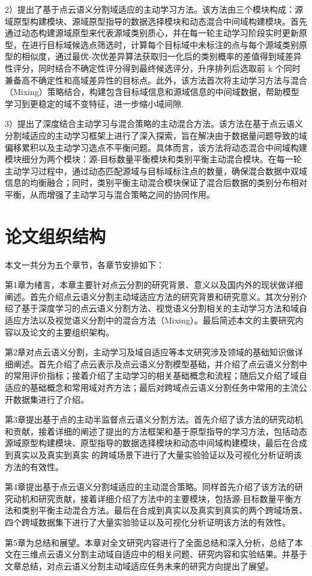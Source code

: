 2）提出了基于点云语义分割域适应的主动学习方法。该方法由三个模块构成：源域原型构建模块、源域原型指导的数据选择模块和动态混合中间域构建模块。首先通过动态构建源域原型来代表源域类别质心，并在每一轮主动学习阶段实时更新原型，在进行目标域候选点筛选时，计算每个目标域中未标注的点与每个源域类别原型的相似度，通过最优-次优差异算法获取归一化后的类别概率的差值得到域差异性评分，同时结合不确定性评分得到最终候选评分，升序排列后选取前 k 个同时兼备高不确定性和高域差异性的目标点。此外，该方法首次将主动学习方法与混合（Mixing）策略结合，构建包含目标域信息和源域信息的中间域数据，帮助模型学习到更稳定的域不变特征，进一步缩小域间隙.

3）提出了深度结合主动学习与混合策略的主动混合方法。该方法在基于点云语义分割域适应的主动学习框架上进行了深入探索，旨在解决由于数据量问题导致的域偏移累积以及主动学习选点不平衡问题。具体而言，该方法将动态混合中间域构建模块细分为两个模块：源-目标数量平衡模块和类别平衡主动混合模块。在每一轮主动学习过程中，通过动态匹配源域与目标域标注点的数量，确保混合数据中双域信息的均衡融合；同时，类别平衡主动混合模块保证了混合后数据的类别分布相对平衡，从而增强了主动学习与混合策略之间的协同作用。
\section{论文组织结构}
本文一共分为五个章节，各章节安排如下：

第1章为绪言，本章主要针对点云分割的研究背景、意义以及国内外的现状做详细阐述。首先介绍点云语义分割主动域适应方法的研究背景和研究意义。其次分别介绍了基于深度学习的点云语义分割方法、视觉语义分割相关的主动学习方法和域自适应方法以及视觉语义分割中的混合方法（Mixing）。最后简述本文的主要研究内容以及论文的主要组织架构。

第2章对点云语义分割，主动学习及域自适应等本文研究涉及领域的基础知识做详细阐述。首先介绍了点云表示及点云语义分割模型基础，并介绍了点云语义分割中的常用评价指标；接着介绍了主动学习的相关基础概念和流程；随后又介绍了域自适应的基础概念和常用域对齐方法；最后对跨域点云语义分割任务中常用的主流公开数据集进行了介绍。

第3章提出基于点的主动半监督点云语义分割方法。首先介绍了该方法的研究动机和贡献，接着详细的阐述了提出的方法框架和基于原型指导的学习方法，包括动态源域原型构建模块、原型指导的数据选择模块和动态中间域构建模块，最后在合成到真实以及真实到真实
的跨域场景下进行了大量实验验证以及可视化分析证明该方法的有效性。

第4章提出基于点云语义分割域适应的主动混合策略。同样首先介绍了该方法的研究动机和研究贡献，接着详细介绍了方法中的主要模块，包括源-目标数量平衡方法和类别平衡主动混合方法。最后在合成到真实以及真实到真实的两个跨域场景、四个跨域数据集下进行了大量实验验证以及可视化分析证明该方法的有效性。

第5章为总结和展望。本章对全文研究内容进行了全面总结和深入分析，总结了本文在三维点云语义分割主动域自适应中的相关问题、研究内容和实验结果。并基于文章总结，对点云语义分割主动域适应任务未来的研究方向提出了展望。

\clearpage